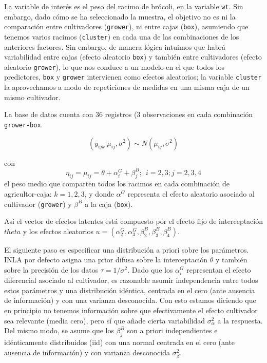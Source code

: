 \documentclass[
]{book}
\begin{document}
La variable de interés es el peso del racimo de brócoli, en la variable \texttt{wt}. Sin embargo, dado cómo se ha seleccionado la muestra, el objetivo no es ni la comparación entre cultivadores (\texttt{grower}), ni entre cajas (\texttt{box}), asumiendo que tenemos varios racimos (\texttt{cluster}) en cada una de las combinaciones de los anteriores factores. Sin embargo, de manera lógica intuimos que habrá variabilidad entre cajas (efecto aleatorio \texttt{box}) y también entre cultivadores (efecto aleatorio \texttt{grower}), lo que nos conduce a un modelo en el que todos los predictores, \texttt{box} y \texttt{grower} intervienen como efectos aleatorios; la variable \texttt{cluster} la aprovechamos a modo de repeticiones de medidas en una misma caja de un mismo cultivador.

La base de datos cuenta con 36 registros (3 observaciones en cada combinación \texttt{grower-box}.

\[(y_{ijk}|\mu_{ij},\sigma^2 ) \sim N(\mu_{ij},\sigma^2)\]

con \[\eta_{ij} =\mu_{ij}= \theta + \alpha_i^G + \beta_j^B; \ \  i=2,3; j=2,3,4\]
el peso medio que comparten todos los racimos en cada combinación de agricultor-caja: \(k=1,2,3\), y donde \(\alpha^G\) representa el efecto aleatorio asociado al cultivador (\texttt{grower}) y \(\beta^B\) a la caja (\texttt{box}).

Así el vector de efectos latentes está compuesto por el efecto fijo de interceptación \(theta\) y los efectos aleatorios \(u=(\alpha_2^G,\alpha_3^G,\beta_2^B,\beta_3^B,\beta_4^B)\).

El siguiente paso es especificar una distribución a priori sobre los parámetros. INLA por defecto asigna una prior difusa sobre la interceptación \(\theta\) y también sobre la precisión de los datos \(\tau=1/\sigma^2\). Dado que los \(\alpha_i^G\) representan el efecto diferencial asociado al cultivador, es razonable asumir independencia entre todos estos parámetros y una distribución idéntica, centrada en el cero (ante ausencia de información) y con una varianza desconocida. Con esto estamos diciendo que en principio no tenemos información sobre que efectivamente el efecto cultivador sea relevante (media cero), pero sí que añade cierta variabilidad \(\sigma_{\alpha}^2\) a la respuesta. Del mismo modo, se asume que los \(\beta_j^B\) son a priori independientes e idénticamente distribuidos (iid) con una normal centrada en el cero (ante ausencia de información) y con varianza desconocida \(\sigma_{\beta}^2\).
\end{document}
